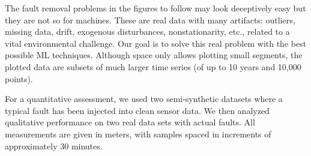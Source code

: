 \documentclass{article}
\begin{document}
The fault removal problems in the figures to follow may look deceptively easy but they are not so for machines. These are real data with many artifacts: outliers, missing data, drift, exogenous disturbances, nonstationarity, etc., related to a vital environmental challenge. Our goal is to solve this real problem with the best possible ML techniques. Although space only allows plotting small segments, the plotted data are subsets of much larger time series (of up to 10 years and 10,000 points). 

For a quantitative assessment, we used two semi-synthetic datasets
where a typical fault has been injected into clean sensor data. We
then analyzed qualitative performance on two real data sets with actual
faults. All measurements are given in meters, with samples spaced in
increments of approximately 30 minutes. %


\end{document}
